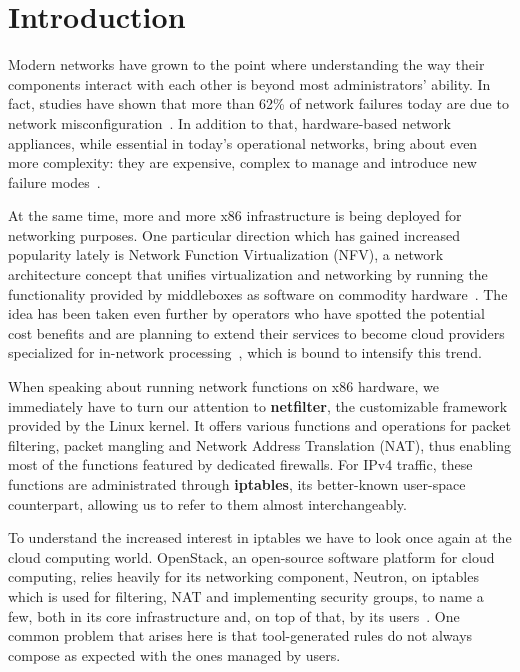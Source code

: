 \chapter{Introduction}


Modern networks have grown to the point where understanding the way their
components interact with each other is beyond most administrators' ability. In
fact, studies have shown that more than 62\% of network failures today are due
to network misconfiguration~\cite{alimi2008shadow}.  In addition to that,
hardware-based network appliances, while essential in today's operational
networks, bring about even more complexity: they are expensive, complex to
manage and introduce new failure modes~\cite{sherry2012making}.

At the same time, more and more x86 infrastructure is being deployed for
networking purposes. One particular direction which has gained increased
popularity lately is Network Function Virtualization (NFV), a network architecture concept that unifies
virtualization and networking by running the functionality provided by
middleboxes as software on commodity hardware~\cite{martins2014clickos,
stoenescu2015net}. The idea has been taken even further by operators who have
spotted the potential cost benefits and are planning to extend their services
to become cloud providers specialized for in-network
processing~\cite{stoenescu2015net}, which is bound to intensify this trend.

When speaking about running network functions on x86 hardware, we immediately
have to turn our attention to \textbf{netfilter}, the customizable framework
provided by the Linux kernel.  It offers various functions and operations for
packet filtering, packet mangling and Network Address Translation
(NAT), thus enabling most of the
functions featured by dedicated firewalls. For IPv4 traffic, these functions
are administrated through \textbf{iptables}, its better-known user-space
counterpart, allowing us to refer to them almost interchangeably.

To understand the increased interest in iptables we have to look once again at
the cloud computing world.  OpenStack, an open-source software platform for
cloud computing, relies heavily for its networking component, Neutron, on
iptables which is used for filtering, NAT and implementing security groups, to
name a few, both in its core infrastructure and, on top of that, by its
users~\cite{denton2014learning}.  One common problem that arises here is that
tool-generated rules do not always compose as expected with the ones managed by
users.

